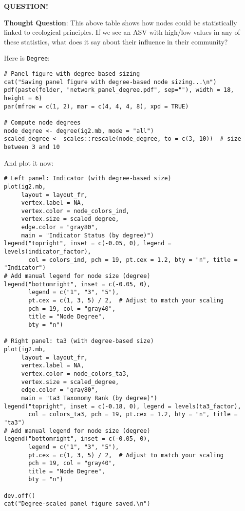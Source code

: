 \documentclass[
]{book}
\newenvironment{bluebox}{
  \definecolor{shadecolor}{RGB}{172, 210, 237}
  \color{white}
  \begin{shaded}}
 {\end{shaded}}
\begin{document}
\begin{bluebox}

\begin{center}
\textbf{QUESTION!}

\end{center}

\textbf{Thought Question}: This above table shows how nodes could be statistically linked to ecological principles. If we see an ASV with high/low values in any of these statistics, what does it say about their influence in their community?

\end{bluebox}

Here is \texttt{Degree}:

\begin{verbatim}
# Panel figure with degree-based sizing
cat("Saving panel figure with degree-based node sizing...\n")
pdf(paste(folder, "network_panel_degree.pdf", sep=""), width = 18, height = 6)
par(mfrow = c(1, 2), mar = c(4, 4, 4, 8), xpd = TRUE)

# Compute node degrees
node_degree <- degree(ig2.mb, mode = "all")
scaled_degree <- scales::rescale(node_degree, to = c(3, 10))  # size between 3 and 10
\end{verbatim}

And plot it now:

\begin{verbatim}
# Left panel: Indicator (with degree-based size)
plot(ig2.mb,
     layout = layout_fr,
     vertex.label = NA,
     vertex.color = node_colors_ind,
     vertex.size = scaled_degree,
     edge.color = "gray80",
     main = "Indicator Status (by degree)")
legend("topright", inset = c(-0.05, 0), legend = levels(indicator_factor),
       col = colors_ind, pch = 19, pt.cex = 1.2, bty = "n", title = "Indicator")
# Add manual legend for node size (degree)
legend("bottomright", inset = c(-0.05, 0),
       legend = c("1", "3", "5"),
       pt.cex = c(1, 3, 5) / 2,  # Adjust to match your scaling
       pch = 19, col = "gray40",
       title = "Node Degree",
       bty = "n")

# Right panel: ta3 (with degree-based size)
plot(ig2.mb,
     layout = layout_fr,
     vertex.label = NA,
     vertex.color = node_colors_ta3,
     vertex.size = scaled_degree,
     edge.color = "gray80",
     main = "ta3 Taxonomy Rank (by degree)")
legend("topright", inset = c(-0.18, 0), legend = levels(ta3_factor),
       col = colors_ta3, pch = 19, pt.cex = 1.2, bty = "n", title = "ta3")
# Add manual legend for node size (degree)
legend("bottomright", inset = c(-0.05, 0),
       legend = c("1", "3", "5"),
       pt.cex = c(1, 3, 5) / 2,  # Adjust to match your scaling
       pch = 19, col = "gray40",
       title = "Node Degree",
       bty = "n")

dev.off()
cat("Degree-scaled panel figure saved.\n")
\end{verbatim}
\end{document}
